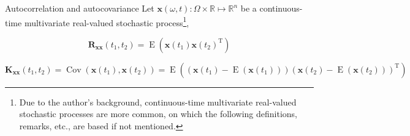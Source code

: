 \documentclass[utf-8, 10pt, aspectratio=1610]{beamer}
\begin{document}
\begin{frame}{Autocorrelation and autocovariance}
	\vspace*{\fill}
	Let \(\mathbf{x}(\omega, t): \Omega\times \mathbb{R}\mapsto \mathbb{R}^n\) be a continuous-time multivariate real-valued stochastic process\footnote{Due to the author's background, continuous-time multivariate real-valued stochastic processes are more common, on which the following definitions, remarks, etc., are based if not mentioned.},

	\begin{definition}[autocorrelation]
		\begin{equation}
			\mathbf{R}_{\mathbf{x}\mathbf{x}}(t_1,t_2) = \operatorname{E}\left(\mathbf{x}(t_1) \mathbf{x}(t_2)^{\mathrm{T}}\right)
		\end{equation}
	\end{definition}
	\begin{definition}[autocovariance]
		\begin{equation}
			\mathbf{K}_{\mathbf{x}\mathbf{x}}(t_1,t_2) = \operatorname{Cov}\left(\mathbf{x}(t_1), \mathbf{x}(t_2)\right) = \operatorname{E}\left(\left(\mathbf{x}(t_1) - \operatorname{E}\left(\mathbf{x}(t_1)\right)\right)\left(\mathbf{x}(t_2) - \operatorname{E}\left(\mathbf{x}(t_2)\right)\right)^{\mathrm{T}}\right)
		\end{equation}
	\end{definition}
	\vspace*{\fill}
\end{frame}
\end{document}
